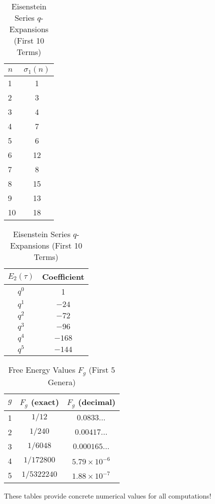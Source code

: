 \begin{table}[h]
\centering
\caption{Eisenstein Series $q$-Expansions (First 10 Terms)}
\label{tab:eisenstein-q-expansions}
\begin{tabular}{|l|c|}
\hline
$n$ & $\sigma_1(n)$ \\
\hline
1 & 1 \\
2 & 3 \\
3 & 4 \\
4 & 7 \\
5 & 6 \\
6 & 12 \\
7 & 8 \\
8 & 15 \\
9 & 13 \\
10 & 18 \\
\hline
\end{tabular}
\quad
\begin{tabular}{|c|c|}
\hline
$E_2(\tau)$ & Coefficient \\
\hline
$q^0$ & 1 \\
$q^1$ & $-24$ \\
$q^2$ & $-72$ \\
$q^3$ & $-96$ \\
$q^4$ & $-168$ \\
$q^5$ & $-144$ \\
\hline
\end{tabular}
\end{table}

\begin{table}[h]
\centering
\caption{Free Energy Values $F_g$ (First 5 Genera)}
\label{tab:free-energy-values}
\begin{tabular}{|c|c|c|}
\hline
$g$ & $F_g$ (exact) & $F_g$ (decimal) \\
\hline
1 & $1/12$ & $0.0833\ldots$ \\
2 & $1/240$ & $0.00417\ldots$ \\
3 & $1/6048$ & $0.000165\ldots$ \\
4 & $1/172800$ & $5.79 \times 10^{-6}$ \\
5 & $1/5322240$ & $1.88 \times 10^{-7}$ \\
\hline
\end{tabular}
\end{table}

These tables provide concrete numerical values for all computations!

